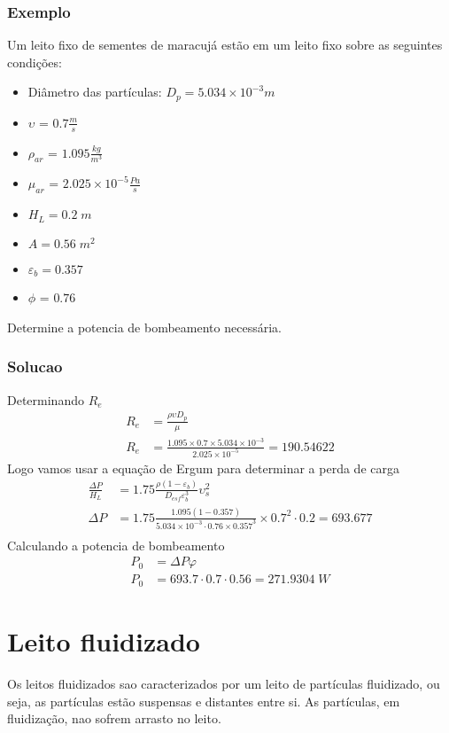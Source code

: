 \subsubsection{Exemplo}
Um leito fixo de sementes de maracujá estão em um leito fixo sobre as seguintes condições:
\begin{itemize}
    \item Diâmetro das partículas: \(D_{p} = 5.034 \times 10^{-3} m\)
    \item \(\upsilon \) = \(0.7 \frac{m}{s}\) 
    \item \(\rho_{ar}\) = \(1.095 \frac{kg}{m^{3}}\)
    \item \(\mu_{ar}\) = \(2.025 \times 10^{-5} \frac{Pa}{s}\)
    \item \(H_{L} = 0.2 \; m\)
    \item \(A = 0.56 \;  m^{2} \)
    \item \(\varepsilon _{b} = 0.357\)
    \item \(\phi\) = \(0.76\) 
\end{itemize}
Determine a potencia de bombeamento necessária. \par
\subsubsection{Solucao}
Determinando \(R_e\) 
\begin{align}
    R_{e} &= \frac{\rho \upsilon D_{p} }{\mu } \\
    R_{e} &= \frac{1.095 \times 0.7 \times 5.034 \times 10^{-3} }{2.025 \times 10^{-5} } = 190.54622 
\end{align}
Logo vamos usar a equação de Ergum para determinar a perda de carga
\begin{align}
    \frac{\Delta P}{H_{L}} &= 1.75 \frac{\rho \left( 1 - \varepsilon _{b}  \right) }{D_{esf} \varepsilon _{b} ^{3}  }\upsilon _{s} ^{2} \\
    \Delta P &= 1.75 \frac{1.095 \left( 1 - 0.357 \right) }{5.034 \times 10^{-3} \cdot  0.76 \times 0.357^{3}  } \times 0.7^{2} \cdot 0.2 = 693.677 \\
\end{align}
Calculando a potencia de bombeamento
\begin{align}
    P_0 &= {\Delta P \varphi} \\
    P_0 &= 693.7 \cdot 0.7 \cdot 0.56 = 271.9304 \; W
\end{align}
\section{Leito fluidizado}
Os leitos fluidizados sao caracterizados por um leito de partículas fluidizado, ou seja, as
partículas estão suspensas e distantes entre si. As partículas, em fluidização, nao sofrem arrasto no
leito. \par

